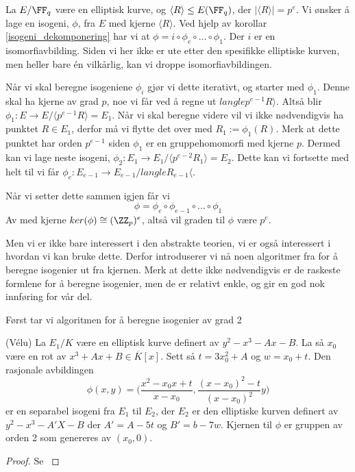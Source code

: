 \begin{eksempel}
\label{eksempel_dekomponere_isogeni}
La $E/\FF_q$ være en elliptisk kurve, og $\langle R\rangle \leq E(\FF_q)$, der $|\langle R \rangle | = p^e$. Vi ønsker å lage en isogeni, $\phi$, fra $E$ med kjerne $\langle R \rangle$. Ved hjelp av korollar \ref{isogeni_dekomponering} har vi at $\phi = i \circ \phi_e \circ \ldots \circ \phi_1$. Der $i$ er en isomorfiavbilding. Siden vi her ikke er ute etter den spesifikke elliptiske kurven, men heller bare én vilkårlig, kan vi droppe isomorfiavbildingen.

Når vi skal beregne isogeniene $\phi_i$ gjør vi dette iterativt, og starter med $\phi_1$. Denne skal ha kjerne av grad $p$, noe vi får ved å regne ut $langle p^{e-1}R \rangle$. Altså blir $\phi_1 : E \rightarrow E/\langle p^{e-1}R \rangle = E_1$. Når vi skal beregne videre vil vi ikke nødvendigvis ha punktet $R \in E_1$, derfor må vi flytte det over med $R_1 := \phi_1(R)$. Merk at dette punktet har orden $p^{e-1}$ siden $\phi_1$ er en gruppehomomorfi med kjerne $p$. Dermed kan vi lage neste isogeni, $\phi_2 : E_1 \rightarrow E_1 / \langle p^{e-2}R_1 \rangle = E_2$. Dette kan vi fortsette med helt til vi får $\phi_e : E_{e-1} \rightarrow E_{e-1} /langle R_{e-1} \langle$. 

Når vi setter dette sammen igjen får vi $$\phi = \phi_e \circ \phi_{e-1} \circ \ldots \circ \phi_1 $$ Av med kjerne $ker(\phi) \cong (\ZZ_p)^e$, altså vil graden til $\phi$ være $p^e$.
\end{eksempel}

Men vi er ikke bare interessert i den abstrakte teorien, vi er også interessert i hvordan vi kan bruke dette. Derfor introduserer vi nå noen algoritmer fra for å beregne isogenier ut fra kjernen. Merk at dette ikke nødvendigvis er de raskeste formlene for å beregne isogenier, men de er relativt enkle, og gir en god nok innføring for vår del.


Først tar vi algoritmen for å beregne isogenier av grad 2
\begin{teorem}
(Vélu) \cite{velu} La $E_1/K$ være en elliptisk kurve definert av $y^2 - x^3 - Ax - B$. La så $x_0$ være en rot av $x^3 + Ax + B \in \overline{K}[x]$. Sett så $t = 3x_0^2 + A$ og $w = x_0 + t$. Den rasjonale avbildingen $$\phi(x,y) = \Bigg( \frac{x^2-x_0x+t}{x-x_0}, \frac{(x- x_0)^2 - t}{(x-x_0)^2}y \Bigg)$$ er en separabel isogeni fra $E_1$  til $E_2$, der $E_2$ er den elliptiske kurven definert av $y^2 - x^3 - A'X - B$ der $A' = A - 5t$ og $B' = b - 7w$. Kjernen til $\phi$ er gruppen av orden 2 som genereres av $(x_0, 0)$. 
\begin{proof}
Se \cite[6.12]{sutherland-notes}
\end{proof}
\end{teorem}


